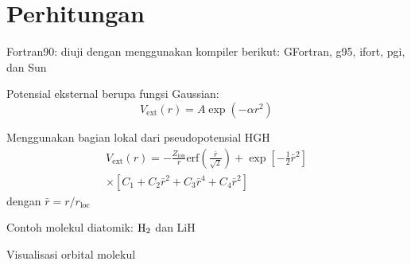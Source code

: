 \section{Perhitungan}

Fortran90:
diuji dengan menggunakan kompiler berikut: GFortran, g95, ifort, pgi, dan Sun

Potensial eksternal berupa fungsi Gaussian:
\begin{equation}
V_{\mathrm{ext}}(r) = A\exp(-\alpha r^2)
\end{equation}

Menggunakan bagian lokal dari pseudopotensial HGH
\begin{multline}
V_{\mathrm{ext}}(r) = -\frac{Z_\mathrm{ion}}{r}
\mathrm{erf}\left(\frac{\bar{r}}{\sqrt{2}}\right) +
\exp\left[-\frac{1}{2}\bar{r}^2\right] \\ 
\times
\left[
C_{1} + C_{2}\bar{r}^2 + C_{3}\bar{r}^4 + C_{4}\bar{r}^2
\right]
\end{multline}
dengan $\bar{r} = r/r_{\mathrm{loc}}$


Contoh molekul diatomik: $\ce{H2}$ dan LiH

Visualisasi orbital molekul
